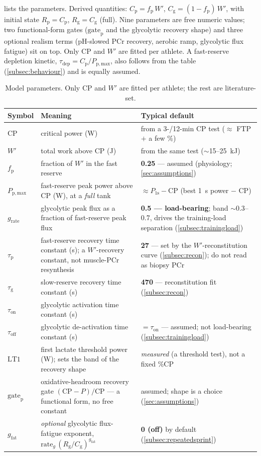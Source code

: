 \documentclass[11pt,a4paper]{article}
\newcommand{\Wp}{\ensuremath{W'}}
\newcommand{\CP}{\ensuremath{\mathrm{CP}}}
\newcommand{\LTone}{\ensuremath{\mathrm{LT1}}}
\newcommand{\fp}{\ensuremath{f_{\mathrm p}}}
\newcommand{\Rp}{\ensuremath{R_{\mathrm p}}}
\newcommand{\Rg}{\ensuremath{R_{\mathrm g}}}
\newcommand{\Cp}{\ensuremath{C_{\mathrm p}}}
\newcommand{\Cg}{\ensuremath{C_{\mathrm g}}}
\newcommand{\Ppmax}{\ensuremath{P_{\mathrm{p,max}}}}
\newcommand{\grate}{\ensuremath{g_{\mathrm{rate}}}}
\newcommand{\taup}{\ensuremath{\tau_{\mathrm p}}}
\newcommand{\taug}{\ensuremath{\tau_{\mathrm g}}}
\newcommand{\tauon}{\ensuremath{\tau_{\mathrm{on}}}}
\newcommand{\tauoff}{\ensuremath{\tau_{\mathrm{off}}}}
\newcommand{\taudep}{\ensuremath{\tau_{\mathrm{dep}}}}
\newcommand{\gatep}{\ensuremath{\mathrm{gate}_{\mathrm p}}}
\newcommand{\Pos}{\ensuremath{P_{1\mathrm s}}}
\begin{document}
 lists the parameters. Derived quantities: $\Cp = \fp\,\Wp$, $\Cg = (1-\fp)\,\Wp$, with
initial state $\Rp = \Cp$, $\Rg = \Cg$ (full). Nine parameters are free numeric values; two
functional-form gates ($\gatep$ and the glycolytic recovery shape) and three optional realism terms
(pH-slowed PCr recovery, aerobic ramp, glycolytic flux fatigue) sit on top. Only \CP{} and \Wp{} are
fitted per athlete. A fast-reserve depletion kinetic, $\taudep = \Cp/\Ppmax$, also follows from the table
(\cref{subsec:behaviour}) and is equally assumed.

\begin{table}[htbp]\centering\small
\caption{Model parameters. Only \CP{} and \Wp{} are fitted per athlete; the rest are literature-set.}
\label{tab:params}
\renewcommand{\arraystretch}{1.25}
\begin{tabularx}{\linewidth}{@{}l>{\raggedright\arraybackslash}X>{\raggedright\arraybackslash}X@{}}
\toprule
\textbf{Symbol} & \textbf{Meaning} & \textbf{Typical default} \\
\midrule
\CP & critical power (W) & from a 3-/12-min \CP{} test ($\approx$ FTP $+$ a few \%) \\
\Wp & total work above \CP{} (J) & from the same test ($\sim$15--25~kJ) \\
\fp & fraction of \Wp{} in the fast reserve & \textbf{0.25} --- assumed (physiology; \cref{sec:assumptions}) \\
\Ppmax & fast-reserve peak power above \CP{} (W), at a \emph{full} tank & $\approx \Pos - \CP$ (best 1~s power $-$ \CP) \\
\grate & glycolytic peak flux as a fraction of fast-reserve peak flux & \textbf{0.5 --- load-bearing};\citep{diPrampero1999} band $\sim$0.3--0.7, drives the training-load separation (\cref{subsec:trainingload}) \\
\taup & fast-reserve recovery time constant (s); a \Wp-recovery constant, not muscle-PCr resynthesis & \textbf{27} --- set by the \Wp-reconstitution curve (\cref{subsec:recon}); do not read as biopsy PCr \\
\taug & slow-reserve recovery time constant (s) & \textbf{470} --- reconstitution fit\citep{Ferguson2010,ChorleyLamb2020} (\cref{subsec:recon}) \\
\tauon & glycolytic activation time constant (s) & 6\citep{Parolin1999} \\
\tauoff & glycolytic de-activation time constant (s) & $=\tauon$ --- assumed; not load-bearing (\cref{subsec:trainingload}) \\
\LTone & first lactate threshold power (W); sets the band of the recovery shape & \emph{measured} (a threshold test), not a fixed \%\CP \\
\gatep & oxidative-headroom recovery gate $(\CP-P)/\CP$ --- a functional form, no free constant & assumed; shape is a choice (\cref{sec:assumptions}) \\
$g_{\mathrm{fat}}$ & \emph{optional} glycolytic flux-fatigue exponent, $\mathrm{rate}_g\,(\Rg/\Cg)^{g_{\mathrm{fat}}}$ & \textbf{0 (off)} by default (\cref{subsec:repeatedsprint}) \\
\bottomrule
\end{tabularx}
\end{table}
\end{document}
